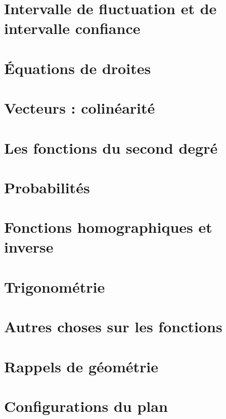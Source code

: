 \documentclass[a4paper,12pt]{book}
\begin{document}
\chapter{Intervalle de fluctuation et de intervalle confiance}


\chapter{Équations de droites}


\chapter{Vecteurs : colinéarité}


\chapter{Les fonctions du second degré}


\chapter{Probabilités}


\chapter{Fonctions homographiques et inverse}


\chapter{Trigonométrie}



\chapter{Autres choses sur les fonctions}


\chapter{Rappels de géométrie}


\chapter{Configurations du plan}

\end{document}

